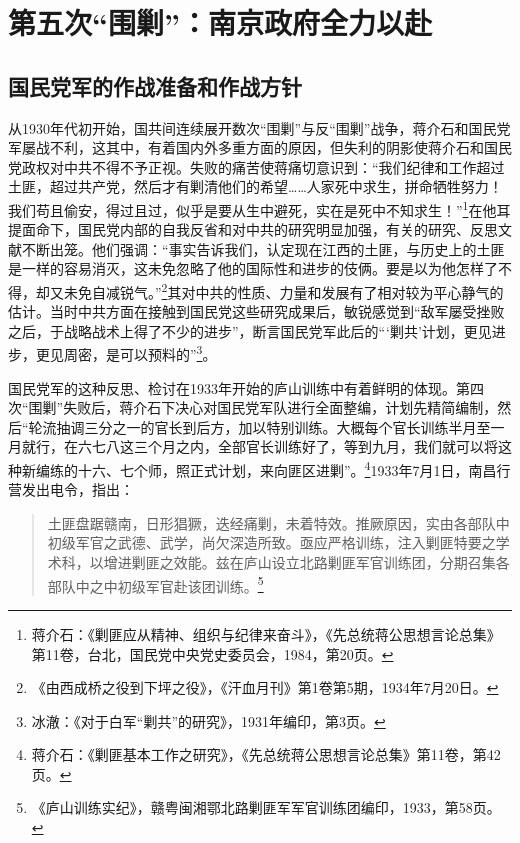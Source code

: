 \chapter{第五次“围剿”：南京政府全力以赴}

\section{国民党军的作战准备和作战方针}


从1930年代初开始，国共间连续展开数次“围剿”与反“围剿”战争，蒋介石和国民党军屡战不利，这其中，有着国内外多重方面的原因，但失利的阴影使蒋介石和国民党政权对中共不得不予正视。失败的痛苦使蒋痛切意识到：“我们纪律和工作超过土匪，超过共产党，然后才有剿清他们的希望……人家死中求生，拼命牺牲努力！我们苟且偷安，得过且过，似乎是要从生中避死，实在是死中不知求生！”\footnote{蒋介石：《剿匪应从精神、组织与纪律来奋斗》，《先总统蒋公思想言论总集》第11卷，台北，国民党中央党史委员会，1984，第20页。}在他耳提面命下，国民党内部的自我反省和对中共的研究明显加强，有关的研究、反思文献不断出笼。他们强调：“事实告诉我们，认定现在江西的土匪，与历史上的土匪是一样的容易消灭，这未免忽略了他的国际性和进步的伎俩。要是以为他怎样了不得，却又未免自减锐气。”\footnote{《由西成桥之役到下坪之役》，《汗血月刊》第1卷第5期，1934年7月20日。}其对中共的性质、力量和发展有了相对较为平心静气的估计。当时中共方面在接触到国民党这些研究成果后，敏锐感觉到“敌军屡受挫败之后，于战略战术上得了不少的进步”，断言国民党军此后的“‘剿共’计划，更见进步，更见周密，是可以预料的”\footnote{冰澈：《对于白军“剿共”的研究》，1931年编印，第3页。}。


国民党军的这种反思、检讨在1933年开始的庐山训练中有着鲜明的体现。第四次“围剿”失败后，蒋介石下决心对国民党军队进行全面整编，计划先精简编制，然后“轮流抽调三分之一的官长到后方，加以特别训练。大概每个官长训练半月至一月就行，在六七八这三个月之内，全部官长训练好了，等到九月，我们就可以将这种新编练的十六、七个师，照正式计划，来向匪区进剿”。\footnote{蒋介石：《剿匪基本工作之研究》，《先总统蒋公思想言论总集》第11卷，第42页。}1933年7月1日，南昌行营发出电令，指出：

\begin{quote}

土匪盘踞赣南，日形猖獗，迭经痛剿，未着特效。推厥原因，实由各部队中初级军官之武德、武学，尚欠深造所致。亟应严格训练，注入剿匪特要之学术科，以增进剿匪之效能。兹在庐山设立北路剿匪军官训练团，分期召集各部队中之中初级军官赴该团训练。\footnote{《庐山训练实纪》，赣粤闽湘鄂北路剿匪军军官训练团编印，1933，第58页。}
\end{quote}


